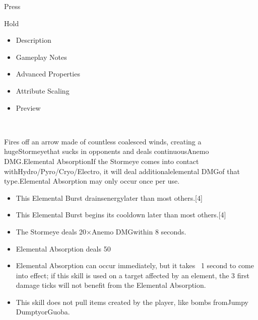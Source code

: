 \documentclass[a4paper,12pt]{article}
\begin{document}
Press\\ \par \vspace{0.5cm}

Hold\\ \par \vspace{0.5cm}

\begin{itemize}
\item Description
\item Gameplay Notes
\item Advanced Properties
\item Attribute Scaling
\item Preview
\end{itemize}\\ \par \vspace{0.5cm}

Fires off an arrow made of countless coalesced winds, creating a hugeStormeyethat sucks in opponents and deals continuousAnemo DMG.Elemental AbsorptionIf the Stormeye comes into contact withHydro/Pyro/Cryo/Electro, it will deal additionalelemental DMGof that type.Elemental Absorption may only occur once per use.\\ \par \vspace{0.5cm}

\begin{itemize}
\item This Elemental Burst drainsenergylater than most others.[4]
\item This Elemental Burst begins its cooldown later than most others.[4]
\item The Stormeye deals 20×Anemo DMGwithin 8 seconds.
\item Elemental Absorption deals 50%
\item Elemental Absorption can occur immediately, but it takes ~1 second to come into effect; if this skill is used on a target affected by an element, the 3 first damage ticks will not benefit from the Elemental Absorption.
\item This skill does not pull items created by the player, like bombs fromJumpy DumptyorGuoba.
\end{itemize}\\ \par \vspace{0.5cm}
\end{document}
